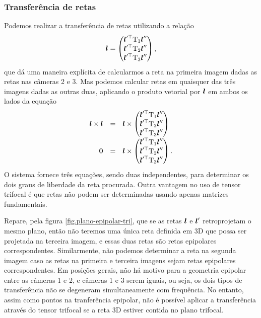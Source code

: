 \subsubsection{Transferência de retas}
Podemos realizar a transferência de retas utilizando a relação
\begin{equation*}
\boldsymbol{l}=
\begin{pmatrix}
\boldsymbol{l}'^\top \mbox{T}_1\boldsymbol{l}''\\
\boldsymbol{l}'^\top \mbox{T}_2\boldsymbol{l}''\\
\boldsymbol{l}'^\top \mbox{T}_3\boldsymbol{l}''
\end{pmatrix},
\end{equation*}
que dá uma maneira explícita de calcularmos a reta na primeira imagem dadas as retas nas câmeras 2 e 3. Mas podemos calcular retas em quaisquer das três imagens dadas as outras duas, aplicando o produto vetorial por $\boldsymbol{l}$ em ambos os lados da equação
\begin{equation*}
\begin{array}{rcl}
\boldsymbol{l}\times\boldsymbol{l}&=&\boldsymbol{l}\times
\begin{pmatrix}
\boldsymbol{l}'^\top \mbox{T}_1\boldsymbol{l}''\\
\boldsymbol{l}'^\top \mbox{T}_2\boldsymbol{l}''\\
\boldsymbol{l}'^\top \mbox{T}_3\boldsymbol{l}''
\end{pmatrix}\\
{\bf 0}&=&\boldsymbol{l}\times
\begin{pmatrix}
\boldsymbol{l}'^\top \mbox{T}_1\boldsymbol{l}''\\
\boldsymbol{l}'^\top \mbox{T}_2\boldsymbol{l}''\\
\boldsymbol{l}'^\top \mbox{T}_3\boldsymbol{l}''
\end{pmatrix}.\\
\end{array}
\end{equation*}
O sistema fornece três equações, sendo duas independentes, para determinar os dois graus de liberdade da reta procurada. Outra vantagem no uso de tensor trifocal é que retas não podem ser determinadas usando apenas matrizes fundamentais.

Repare, pela figura \ref{fig.plano-epipolar-tri}, que se as retas $\boldsymbol{l}$ e $\boldsymbol{l}'$ retroprojetam o mesmo plano, então não teremos uma única reta definida em 3D que possa ser projetada na terceira imagem, e essas duas retas são retas epipolares correspondentes. Similarmente, não podemos determinar a reta na segunda imagem caso as retas na primeira e terceira imagens sejam retas epipolares correspondentes. Em posições gerais, não há motivo para a geometria epipolar entre as câmeras 1 e 2, e câmeras 1 e 3 serem iguais, ou seja, os dois tipos de transferência não se degeneram simultaneamente com frequência. No entanto, assim como pontos na tranferência epipolar, não é possível aplicar a transferência através do tensor trifocal se a reta 3D estiver contida no plano trifocal. 

